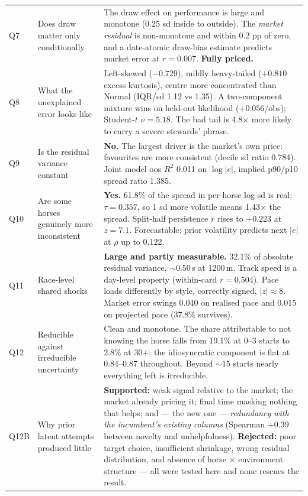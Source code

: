 \documentclass[11pt,a4paper]{article}
\begin{document}
\begin{longtable}{@{}p{}p{}p{}@{}}
Q7 & Does draw matter only conditionally & The draw effect on performance is large and monotone (0.25 sd inside to outside). The \emph{market residual} is non-monotone and within 0.2 pp of zero, and a date-atomic draw-bias estimate predicts market error at $r=0.007$. \textbf{Fully priced.}\\[3pt]
Q8 & What the unexplained error looks like & Left-skewed ($-0.729$), mildly heavy-tailed ($+0.810$ excess kurtosis), centre more concentrated than Normal (IQR/sd 1.12 vs 1.35). A two-component mixture wins on held-out likelihood ($+0.056$/obs); Student-$t$ $\nu=5.18$. The bad tail is 4.8$\times$ more likely to carry a severe stewards' phrase.\\[3pt]
Q9 & Is the residual variance constant & \textbf{No.} The largest driver is the market's own price: favourites are more consistent (decile sd ratio 0.784). Joint model oos $R^2$ 0.011 on $\log|e|$, implied p90/p10 spread ratio 1.385.\\[3pt]
Q10 & Are some horses genuinely more inconsistent & \textbf{Yes.} 61.8\% of the spread in per-horse log sd is real; $\tau=0.357$, so 1 sd more volatile means 1.43$\times$ the spread. Split-half persistence $r$ rises to $+0.223$ at $z=7.1$. Forecastable: prior volatility predicts next $|e|$ at $\rho$ up to 0.122.\\[3pt]
Q11 & Race-level shared shocks & \textbf{Large and partly measurable.} 32.1\% of absolute residual variance, $\sim$0.50\,s at 1200\,m. Track speed is a day-level property (within-card $r=0.504$). Pace loads differently by style, correctly signed, $|z|\approx 8$. Market error swings 0.040 on realised pace and 0.015 on projected pace (37.8\% survives).\\[3pt]
Q12 & Reducible against irreducible uncertainty & Clean and monotone. The share attributable to not knowing the horse falls from 19.1\% at 0--3 starts to 2.8\% at 30$+$; the idiosyncratic component is flat at 0.84--0.87 throughout. Beyond $\sim$15 starts nearly everything left is irreducible.\\[3pt]
Q12B & Why prior latent attempts produced little & \textbf{Supported:} weak signal relative to the market; the market already pricing it; final time masking nothing that helps; and --- the new one --- \emph{redundancy with the incumbent's existing columns} (Spearman $+0.39$ between novelty and unhelpfulness). \textbf{Rejected:} poor target choice, insufficient shrinkage, wrong residual distribution, and absence of horse $\times$ environment structure --- all were tested here and none rescues the result.\\[3pt]

\end{longtable}
\end{document}
